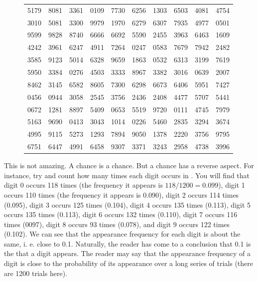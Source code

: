 \begin{figure}[!ht]
\begin{footnotesize}
\begin{tabular}{cccccccccc}
\rowcolor{lightgray} 5179 & 8081 & 3361 & 0109 & 7730 & 6256 & 1303 & 6503 & 4081 & 4754 \\
3010 & 5081 & 3300 & 9979 & 1970 & 6279 & 6307 & 7935 & 4977 & 0501 \\
\hline
9599 & 9828 & 8740 & 6666 & 6692 & 5590 & 2455 & 3963 & 6463 & 1609 \\
\rowcolor{lightgray} 4242 & 3961 & 6247 & 4911 & 7264 & 0247 & 0583 & 7679 & 7942 & 2482 \\
3585 & 9123 & 5014 & 6328 & 9659 & 1863 & 0532 & 6313 & 3199 & 7619 \\
\rowcolor{lightgray} 5950 & 3384 & 0276 & 4503 & 3333 & 8967 & 3382 & 3016 & 0639 & 2007 \\
8462 & 3145 & 6582 & 8605 & 7300 & 6298 & 6673 & 6406 & 5951 & 7427 \\
\hline
0456 & 0944 & 3058 & 2545 & 3756 & 2436 & 2408 & 4477 & 5707 & 5441 \\
\rowcolor{lightgray} 0672 & 1281 & 8897 & 5409 & 0653 & 5519 & 9720 & 0111 & 4745 & 7979 \\
5163 & 9690 & 0413 & 3043 & 1014 & 0226 & 5460 & 2835 & 3294 & 3674 \\
\rowcolor{lightgray} 4995 & 9115 & 5273 & 1293 & 7894 & 9050 & 1378 & 2220 & 3756 & 9795 \\
6751 & 6447 & 4991 & 6458 & 9307 & 3371 & 3243 & 2958 & 4738 & 3996 \\
\hline
\end{tabular}
\end{footnotesize}
\end{figure}

This is not amazing. A chance is a chance. But a chance has a reverse
aspect. For instance, try and count how many times each digit occurs in . You will find that digit 0 occurs 118 times (the frequency it
appears is $118/1200 = 0.099$), digit 1 occurs 110 times (the frequency it
appears is 0.090), digit 2 occurs 114 times (0.095), digit 3 occurs 125
times (0.104), digit 4 occurs 135 times (0.113), digit 5 occurs 135 times
(0.113), digit 6 occurs 132 times (0.110), digit 7 occurs 116 times (0097),
digit 8 occurs 93 times (0.078), and digit 9 occurs 122 times (0.102). We
can see that the appearance frequency for each digit is about the same,
i. e. close to 0.1. Naturally, the reader has come to a conclusion that 0.1
is the  that a digit appears. The reader may say that the
appearance frequency of a digit is close to the probability of its
appearance over a long series of trials (there are 1200 trials here).

